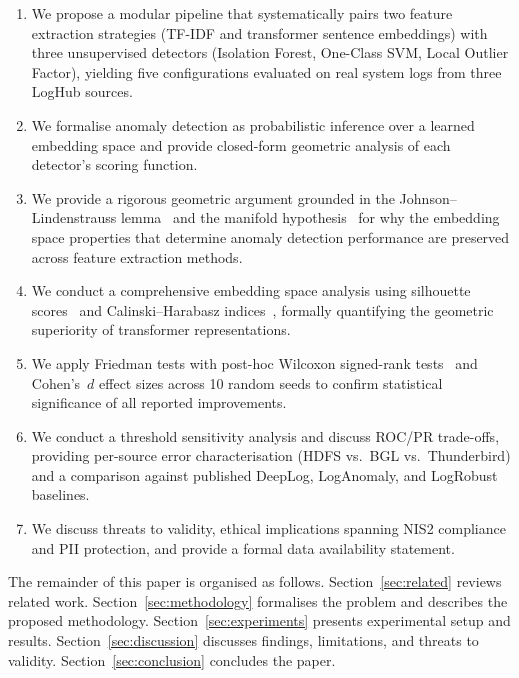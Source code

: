 \documentclass[conference]{IEEEtran}
\begin{document}
\begin{enumerate}
    \item We propose a modular pipeline that systematically pairs two
          feature extraction strategies (TF-IDF and transformer sentence
          embeddings) with three unsupervised detectors (Isolation Forest,
          One-Class SVM, Local Outlier Factor), yielding five configurations
          evaluated on real system logs from three LogHub sources.
    \item We formalise anomaly detection as probabilistic inference over a
          learned embedding space and provide closed-form geometric analysis
          of each detector's scoring function.
    \item We provide a rigorous geometric argument grounded in the
          Johnson--Lindenstrauss lemma~\cite{johnson1984} and the manifold
          hypothesis~\cite{bengio2013} for why the embedding space properties
          that determine anomaly detection performance are preserved across
          feature extraction methods.
    \item We conduct a comprehensive embedding space analysis using silhouette
          scores~\cite{rousseeuw1987} and Calinski--Harabasz
          indices~\cite{calinski1974}, formally quantifying the geometric
          superiority of transformer representations.
    \item We apply Friedman tests with post-hoc Wilcoxon signed-rank tests~\cite{wilcoxon1945}
          and Cohen's~$d$ effect sizes across 10 random seeds to confirm
          statistical significance of all reported improvements.
    \item We conduct a threshold sensitivity analysis and discuss ROC/PR
          trade-offs, providing per-source error characterisation (HDFS
          vs.\ BGL vs.\ Thunderbird) and a comparison against published
          DeepLog, LogAnomaly, and LogRobust baselines.
    \item We discuss threats to validity, ethical implications spanning
          NIS2 compliance and PII protection, and provide a formal data
          availability statement.
\end{enumerate}

The remainder of this paper is organised as follows.
Section~\ref{sec:related} reviews related work.
Section~\ref{sec:methodology} formalises the problem and describes the
proposed methodology.  Section~\ref{sec:experiments} presents experimental
setup and results.  Section~\ref{sec:discussion} discusses findings,
limitations, and threats to validity.  Section~\ref{sec:conclusion}
concludes the paper.
\end{document}
